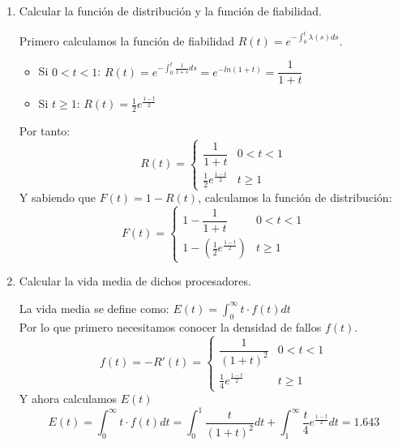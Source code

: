 \begin{enumerate}
    \item Calcular la función de distribución y la función de fiabilidad.
    \begin{tcolorbox}[colback=white,colframe=cyan!50!black,fonttitle=\bfseries]
    Primero calculamos la función de fiabilidad $R(t) = e^{-\int_0^t \lambda(s) ds}$.
    \begin{itemize}
        \item Si $0<t<1$: $R(t)=e^{-\int_0^t \frac{1}{1+s} ds} = e^{-ln(1+t)} = \dfrac{1}{1+t}$
        \item Si $t \geq 1$: $R(t)=\frac{1}{2}e^{\frac{1-t}{2}}$
    \end{itemize}
    Por tanto:
    \[ R(t)=\begin{cases} 
      \dfrac{1}{1+t} & 0<t<1 \\
      \frac{1}{2}e^{\frac{1-t}{2}} & t\geq 1
   \end{cases}
    \]
    Y sabiendo que $F(t) = 1-R(t)$, calculamos la función de distribución:
    \[ F(t)=\begin{cases} 
      1-\dfrac{1}{1+t} & 0<t<1 \\
      1-(\frac{1}{2}e^{\frac{1-t}{2}}) & t\geq 1
   \end{cases}
    \]
    \end{tcolorbox}
    \item Calcular la vida media de dichos procesadores.
    \begin{tcolorbox}[colback=white,colframe=cyan!50!black,fonttitle=\bfseries]
    La vida media se define como: $E(t)= \int_0^{\infty}t\cdot f(t)dt$\\
    Por lo que primero necesitamos conocer la densidad de fallos $f(t)$.
    \[
    f(t)=-R'(t)=\begin{cases} 
      \dfrac{1}{(1+t)^2} & 0<t<1 \\
      \frac{1}{4}e^{\frac{1-t}{2}} & t\geq 1
   \end{cases}
    \]
    Y ahora calculamos $E(t)$
    \[
    E(t)= \int_0^{\infty}t\cdot f(t)dt= \int_0^1\dfrac{t}{(1+t)^2}dt + \int_1^{\infty}\frac{t}{4}e^{\frac{1-t}{2}}dt = 1.643
    \]
    \end{tcolorbox}
\end{enumerate}
